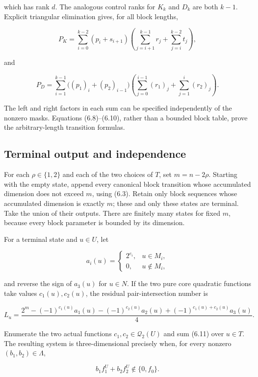 \documentclass[11pt]{article}
\theoremstyle{remark}
\numberwithin{equation}{section}
\begin{document}
which has rank \(d\). The analogous control ranks for \(K_k\) and \(D_k\) are
both \(k-1\). Explicit triangular elimination gives, for all block lengths,

\[
P_K=\sum_{i=0}^{k-2}(p_i+s_{i+1})
\left(\sum_{j=i+1}^{k-1}r_j+\sum_{j=i}^{k-2}t_j\right),          \tag{6.9}
\]

and

\[
P_D=\sum_{i=1}^{k-1}\bigl((p_1)_i+(p_2)_{i-1}\bigr)
\left(\sum_{j=0}^{i-1}(r_1)_j+\sum_{j=1}^{i}(r_2)_j\right).     \tag{6.10}
\]

The left and right factors in each sum can be specified independently of the
nonzero masks. Equations (6.8)--(6.10), rather than a bounded block table, prove
the arbitrary-length transition formulas.

\subsection{Terminal output and independence}


For each \(\rho\in\{1,2\}\) and each of the two choices of \(T\), set
\(m=n-2\rho\). Starting with the empty state, append every canonical block
transition whose accumulated dimension does not exceed \(m\), using (6.3).
Retain only block sequences whose accumulated dimension is exactly \(m\);
these and only these states are terminal. Take the union of their outputs.
There are finitely many states for fixed \(m\), because every block parameter
is bounded by its dimension.

For a terminal state and \(u\in U\), let

\[
a_i(u)=
\begin{cases}
2^{e_i},&u\in M_i,\\
0,&u\notin M_i,
\end{cases}
\]

and reverse the sign of \(a_3(u)\) for \(u\in N\). If the two pure core
quadratic functions take values \(c_1(u),c_2(u)\), the residual pair-intersection
number is

\[
L_u=\frac{2^m-(-1)^{c_1(u)}a_1(u)-(-1)^{c_2(u)}a_2(u)
+(-1)^{c_1(u)+c_2(u)}a_3(u)}4.                  \tag{6.11}
\]

Enumerate the two actual functions \(c_1,c_2\in\mathcal Q_2(U)\) and sum (6.11) over
\(u\in T\). The resulting system is three-dimensional precisely when, for every
nonzero \((b_1,b_2)\in\Lambda\),

\[
b_1f_1^U+b_2f_2^U\notin\{0,f_0\}.              \tag{6.12}
\]
\end{document}

